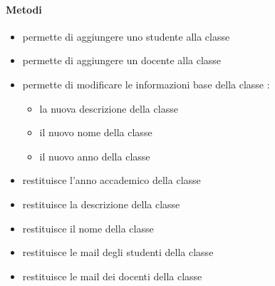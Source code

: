 \paragraph{Metodi}
\begin{itemize}
\item {}
\newline
permette di aggiungere uno studente alla classe
\newline
\item {}
\newline
permette di aggiungere un docente alla classe
\newline
\item {}
\newline
permette
di modificare le informazioni base della classe
\newline
{} :
\begin{itemize}
\item {}
\newline
la nuova descrizione della classe
\item {}
\newline
il nuovo nome della classe
\item {}
\newline
il nuovo anno della classe
\end{itemize}
\item {}
\newline
restituisce l'anno accademico della classe
\newline
\item {}
\newline
restituisce la descrizione della classe
\newline
\item {}
\newline
restituisce il nome della classe
\newline
\item {}
\newline
restituisce le mail degli studenti della classe
\newline
\item {}
\newline
restituisce le mail dei docenti della classe

\end{itemize}
